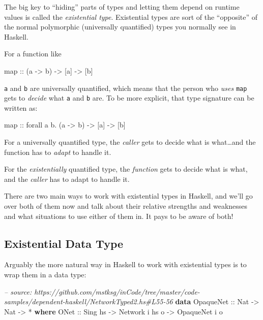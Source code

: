 \documentclass[]{article}
\newenvironment{Shaded}{}{}
\newcommand{\KeywordTok}[1]{\textcolor[rgb]{0.00,0.44,0.13}{\textbf{{#1}}}}
\newcommand{\DataTypeTok}[1]{\textcolor[rgb]{0.56,0.13,0.00}{{#1}}}
\newcommand{\CommentTok}[1]{\textcolor[rgb]{0.38,0.63,0.69}{\textit{{#1}}}}
\newcommand{\OtherTok}[1]{\textcolor[rgb]{0.00,0.44,0.13}{{#1}}}
\newcommand{\FunctionTok}[1]{\textcolor[rgb]{0.02,0.16,0.49}{{#1}}}
\newcommand{\NormalTok}[1]{{#1}}
\begin{document}
The big key to ``hiding'' parts of types and letting them depend on runtime
values is called the \emph{existential type}. Existential types are sort of the
``opposite'' of the normal polymorphic (universally quantified) types you
normally see in Haskell.

For a function like

\begin{Shaded}
\begin{Highlighting}[]
\NormalTok{map}\OtherTok{ ::} \NormalTok{(a }\OtherTok{->} \NormalTok{b) }\OtherTok{->} \NormalTok{[a] }\OtherTok{->} \NormalTok{[b]}
\end{Highlighting}
\end{Shaded}

\texttt{a} and \texttt{b} are universally quantified, which means that the
person who \emph{uses} \texttt{map} gets to \emph{decide} what \texttt{a} and
\texttt{b} are. To be more explicit, that type signature can be written as:

\begin{Shaded}
\begin{Highlighting}[]
\NormalTok{map}\OtherTok{ ::} \NormalTok{forall a b}\FunctionTok{.} \NormalTok{(a }\OtherTok{->} \NormalTok{b) }\OtherTok{->} \NormalTok{[a] }\OtherTok{->} \NormalTok{[b]}
\end{Highlighting}
\end{Shaded}

For a universally quantified type, the \emph{caller} gets to decide what is
what\ldots{}and the function has to \emph{adapt} to handle it.

For the \emph{existentially} quantified type, the \emph{function} gets to decide
what is what, and the \emph{caller} has to adapt to handle it.

There are two main ways to work with existential types in Haskell, and we'll go
over both of them now and talk about their relative strengths and weaknesses and
what situations to use either of them in. It pays to be aware of both!

\subsection{Existential Data Type}\label{existential-data-type}

Arguably the more natural way in Haskell to work with existential types is to
wrap them in a data type:

\begin{Shaded}
\begin{Highlighting}[]
\CommentTok{-- source: https://github.com/mstksg/inCode/tree/master/code-samples/dependent-haskell/NetworkTyped2.hs#L55-56}
\KeywordTok{data} \DataTypeTok{OpaqueNet}\OtherTok{ ::} \DataTypeTok{Nat} \OtherTok{->} \DataTypeTok{Nat} \OtherTok{->} \FunctionTok{*} \KeywordTok{where}
    \DataTypeTok{ONet}\OtherTok{ ::} \DataTypeTok{Sing} \NormalTok{hs }\OtherTok{->} \DataTypeTok{Network} \NormalTok{i hs o }\OtherTok{->} \DataTypeTok{OpaqueNet} \NormalTok{i o}
\end{Highlighting}
\end{Shaded}
\end{document}
